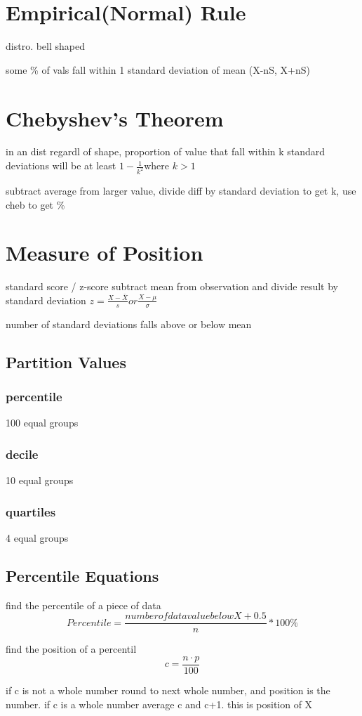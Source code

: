 \documentclass[11pt]{amsart}
\begin{document}
\section{Empirical(Normal) Rule}
\par distro. bell shaped
\par some \% of vals fall within 1 standard deviation of mean (X-nS, X+nS)
\section{Chebyshev's Theorem}
\par in an dist regardl of shape, proportion of value that fall within k standard deviations will be at least $1-\frac{1}{k^2}$where $k > 1$
\par subtract average from larger value, divide diff by standard deviation to get k, use cheb to get \%
\section{Measure of Position}
\par standard score / z-score subtract mean from observation and divide result by standard deviation $z = \frac {X - \bar{X}}{s}  or  \frac{X - \mu}{\sigma} $
\par number of standard deviations falls above or below mean
\subsection{Partition Values}
\subsubsection{percentile}
\par 100 equal groups
\subsubsection{decile}
\par 10 equal groups
\subsubsection{quartiles}
\par 4 equal groups
\subsection{Percentile Equations}
\par find the percentile of a piece of data
\begin{equation}
Percentile = \frac{number of data value below X + 0.5}{n} * 100\%
\end{equation}
\par find the position of a percentil
\begin{equation}
  c = \frac{n \cdot p}{100}
\end{equation}
\par if c is not a whole number round to next whole number, and position is
the number. if c is a whole number average c and c+1. this is position of
X
\end{document}
